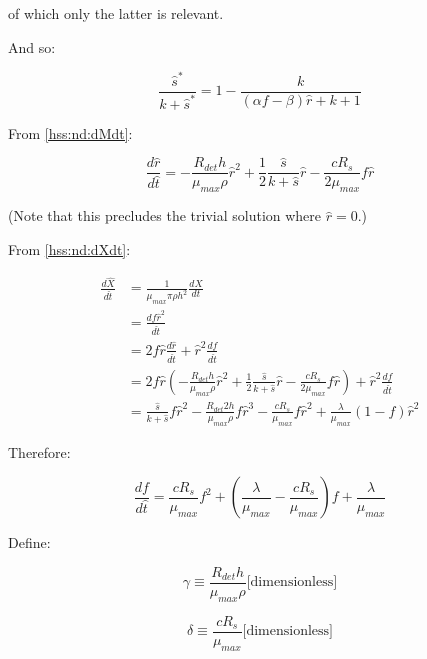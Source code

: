 \documentclass[11pt]{amsart}
\begin{document}
\begin{flushleft}
				of which only the latter is relevant.
				
				And so:
				
				\begin{equation}
					\frac{\hat{s}^*}{k + \hat{s}^*} = 1 - \frac{k}{(\alpha f - \beta)\hat{r} + k+ 1}
					\label{hss:nd:sks}
				\end{equation}
				
				From \ref{hss:nd:dMdt}:
				
				\begin{equation}
					\frac{d\hat{r}}{d\hat{t}} = 
						-\frac{R_{det}h}{\mu_{max}\rho}\hat{r}^2
						+ \frac{1}{2}\frac{\hat{s}}{k + \hat{s}}\hat{r}
						- \frac{cR_s}{2\mu_{max}}f\hat{r}
				\end{equation}
				
				(Note that this precludes the trivial solution where \(\hat{r} = 0\).)
				
				From \ref{hss:nd:dXdt}:
				
				\begin{align}
					\frac{d\hat{X}}{d\hat{t}}	&= \frac{1}{\mu_{max}\pi\rho h^2}\frac{dX}{dt} \\
										&= \frac{df\hat{r}^2}{d\hat{t}} \\
										&= 2f\hat{r}\frac{d\hat{r}}{d\hat{t}} + \hat{r}^2\frac{df}{d\hat{t}} \\
										&= 2f\hat{r}(-\frac{R_{det}h}{\mu_{max}\rho}\hat{r}^2
											+ \frac{1}{2}\frac{\hat{s}}{k + \hat{s}}\hat{r}
											- \frac{cR_s}{2\mu_{max}}f\hat{r})
											+ \hat{r}^2\frac{df}{d\hat{t}} \\
										&= \frac{\hat{s}}{k+\hat{s}}f\hat{r}^2
											- \frac{R_{det}2 h}{\mu_{max}\rho}f\hat{r}^3
											- \frac{c R_s}{\mu_{max}}f\hat{r}^2
											+ \frac{\lambda}{\mu_{max}}(1-f)\hat{r}^2
				\end{align}
				
				Therefore:
				
				\begin{equation}
					\frac{df}{d\hat{t}} = \frac{cR_s}{\mu_{max}}f^2
						+ (\frac{\lambda}{\mu_{max}} - \frac{cR_s}{\mu_{max}})f
						+ \frac{\lambda}{\mu_{max}}
				\end{equation}
				
				Define:
				
				\[ \gamma \equiv \frac{R_{det}h}{\mu_{max}\rho} \textrm{[dimensionless]} \]
				
				\[ \delta \equiv \frac{cR_s}{\mu_{max}} \textrm{[dimensionless]} \]
				

\end{flushleft}
\end{document}
